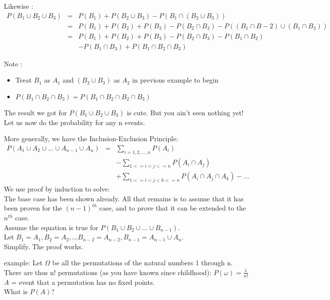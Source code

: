 Likewise : 
\begin{eqnarray*}
P(B_1 \cup B_2 \cup B_3) &=& P(B_1) + P(B_2 \cup B_3) - P(B_1 \cap (B_2 \cup B_3))\\
&=& P(B_1) + P(B_2) + P(B_3) - P(B_2 \cap B_3) - P((B_1 \cap B-2) \cup (B_1 \cap B_3))\\
&=& P(B_1) + P(B_2) + P(B_3) - P(B_2 \cap B_3) - P(B_1 \cap B_2) \\
& & - P(B_1 \cap B_3) + P(B_1 \cap B_2 \cap B_3)
\end{eqnarray*}

Note : 
\begin{itemize}
\item Treat $B_1$ as $A_1$ and $(B_2 \cup B_3)$ as $A_2$ in previous example to begin
\item $P(B_1 \cap B_2 \cap B_3) = P(B_1 \cap B_2 \cap B_2 \cap B_3)$
\end{itemize}

The result we got for $P(B_1 \cup B_2 \cup B_3)$ is cute.  But you ain't seen nothing yet!  Let us now do the probability for any n events.

More generally, we have the Inclusion-Exclusion Principle$:$
\begin{eqnarray*}
P(A_1 \cup A_2 \cup \ldots \cup A_{n-1} \cup A_n) &=& \sum_{i=1, 2, \ldots, n} P(A_i) \\
& & - \sum_{1 <= i < j <= n} P(A_i \cap A_j) \\
& & + \sum_{1 <=i<j<k<= n} P(A_i \cap A_j \cap A_k) - \ldots
\end{eqnarray*}
We use proof by induction to solve:\\
The base case has been shown already.  All that remains is to assume that it has been proven for the $(n-1)^{th}$ case, and to prove that it can be extended to the $n^{th}$ case.\\
Assume the equation is true for $P(B_1 \cup B_2 \cup \ldots \cup B_{n-1})$.\\
Let $B_1 = A_1, B_2 = A_2, \ldots B_{n-2} = A_{n-2}, B_{n-1} = A_{n-1} \cup A_{n}$.\\
Simplify.  The proof works.

example: Let $\Omega$ be all the permutations of the natural numbers 1 through n.\\
There are thus n! permutations  (as you have known since childhood): $P(\omega) = \frac {1}{n!}$\\
$A$ = event that a permutation has no fixed points.\\
What is $P(A)$?


